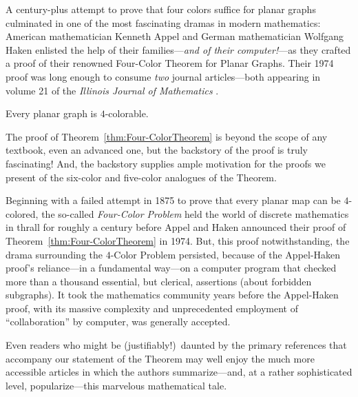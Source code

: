 A century-plus attempt to prove that four colors suffice for planar graphs culminated in one of the most fascinating dramas in modern mathematics:  American mathematician Kenneth Appel and German mathematician Wolfgang Haken enlisted the help of their families---{\em and of their computer!}---as they crafted a proof of their renowned Four-Color Theorem for Planar Graphs.  Their 1974 proof was long enough to consume {\em two} journal articles---both appearing in volume 21 of the {\it Illinois Journal of Mathematics} \cite{AppelH77a,AppelH77b}.


\begin{theorem}
\label{thm:Four-ColorTheorem}
Every planar graph is $4$-colorable.
\end{theorem}


The proof of Theorem~\ref{thm:Four-ColorTheorem} is beyond the scope of any textbook, even an advanced one, but the backstory of the proof is truly fascinating!  And, the backstory supplies ample motivation for the proofs we present of the six-color and five-color analogues of the Theorem.

\medskip

Beginning with a failed attempt in 1875 to prove that every planar map can be $4$-colored, the so-called {\it Four-Color Problem} held the world of discrete mathematics in thrall for roughly a century before Appel and Haken announced their proof of 
Theorem~\ref{thm:Four-ColorTheorem} in 1974.  But, this proof notwithstanding, the drama surrounding the $4$-Color Problem persisted, because of the Appel-Haken proof's reliance---in a fundamental way---on a computer program that checked more than a thousand essential, but clerical, assertions (about forbidden subgraphs).  It took the mathematics community years before the Appel-Haken proof, with its massive complexity and unprecedented employment of ``collaboration'' by computer, was generally accepted.

\smallskip

Even readers who might be (justifiably!)~daunted by the primary references \cite{AppelH77a,AppelH77b} that accompany our statement of the Theorem may well enjoy the much more accessible articles \cite{AppelH77c,AppelH89} in which the authors summarize---and, at a rather sophisticated level, popularize---this marvelous mathematical tale.

